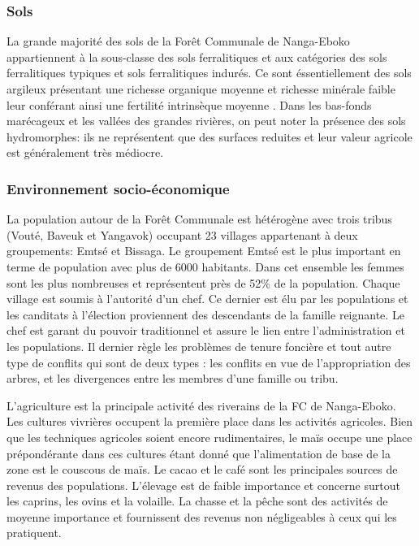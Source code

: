 \documentclass[
  12pt,
  a4paper,
  extrafontsizes,
  onecolumn,
  openright]{book}
\theoremstyle{definition}
\theoremstyle{definition}
\theoremstyle{definition}
\theoremstyle{definition}
\theoremstyle{remark}
\begin{document}
\hypertarget{sols}{%
\subsubsection{Sols}\label{sols}}

La grande majorité des sols de la Forêt Communale de Nanga-Eboko appartiennent à la sous-classe des sols ferralitiques et aux catégories des sols ferralitiques typiques et sols ferralitiques indurés. Ce sont éssentiellement des sols argileux présentant une richesse organique moyenne et richesse minérale faible leur conférant ainsi une fertilité intrinsèque moyenne \citep{Martin1966}. Dans les bas-fonds marécageux et les vallées des grandes rivières, on peut noter la présence des sols hydromorphes: ils ne représentent que des surfaces reduites et leur valeur agricole est généralement très médiocre.

\hypertarget{environnement-socio-uxe9conomique}{%
\subsubsection{Environnement socio-économique}\label{environnement-socio-uxe9conomique}}

La population autour de la Forêt Communale est hétérogène avec trois tribus (Vouté, Baveuk et Yangavok) occupant 23 villages appartenant à deux groupements: Emtsé et Bissaga. Le groupement Emtsé est le plus important en terme de population avec plus de 6000 habitants. Dans cet ensemble les femmes sont les plus nombreuses et représentent près de 52\% de la population. Chaque village est soumis à l'autorité d'un chef. Ce dernier est élu par les populations et les canditats à l'élection proviennent des descendants de la famille reignante. Le chef est garant du pouvoir traditionnel et assure le lien entre l'administration et les populations. Il dernier règle les problèmes de tenure foncière et tout autre type de conflits qui sont de deux types : les conflits en vue de l'appropriation des arbres, et les divergences entre les membres d'une famille ou tribu.

L'agriculture est la principale activité des riverains de la FC de Nanga-Eboko. Les cultures vivrières occupent la première place dans les activités agricoles. Bien que les techniques agricoles soient encore rudimentaires, le maïs occupe une place prépondérante dans ces cultures étant donné que l'alimentation de base de la zone est le couscous de maïs. Le cacao et le café sont les principales sources de revenus des populations. L'élevage est de faible importance et concerne surtout les caprins, les ovins et la volaille. La chasse et la pêche sont des activités de moyenne importance et fournissent des revenus non négligeables à ceux qui les pratiquent.
\end{document}
